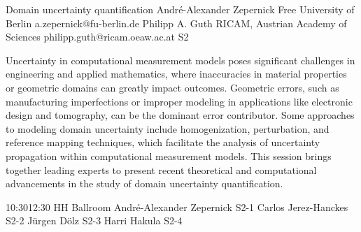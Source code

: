 \documentclass[12pt,lettersize,oneside]{book} %
\begin{document}
\clearpage

\begin{session}
 {Domain uncertainty quantification}%
 {Andr\'e-Alexander Zepernick}%
 {Free University of Berlin}%
 {a.zepernick@fu-berlin.de}%
 {Philipp A. Guth}%
 {RICAM, Austrian Academy of Sciences}%
 {philipp.guth@ricam.oeaw.ac.at}%
 {S2}%
 {}%

 Uncertainty in computational measurement models poses significant challenges in engineering and applied mathematics, where inaccuracies in material properties or geometric domains can greatly impact outcomes. Geometric errors, such as manufacturing imperfections or improper modeling in applications like electronic design and tomography, can be the dominant error contributor. Some approaches to modeling domain uncertainty include homogenization, perturbation, and reference mapping techniques, which facilitate the analysis of uncertainty propagation within computational measurement models. This session brings together leading experts to present recent theoretical and computational advancements in the study of domain uncertainty quantification.
\end{session}



\sessionPart{}%
{\hfill{}
{10:30}{12:30} %
{HH Ballroom}} %
{André-Alexander Zepernick}
{S2-1}
{Carlos Jerez-Hanckes}
{S2-2}
{Jürgen Dölz}
{S2-3}
{Harri Hakula}
{S2-4}
\end{document}
